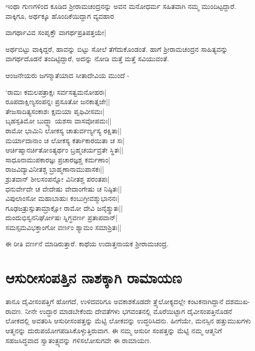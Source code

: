 ಇಂಥಾ ಗುಣಗಳಿಂದ ಕೂಡಿದ ಶ್ರೀರಾಮಚಂದ್ರನನ್ನು ಅವನ ಮನೋಧರ್ಮ ಸಹಿತವಾಗಿ ನಮ್ಮ ಮುಂದಿಟ್ಟದ್ದಾರೆ. ವಾಕ್ಕಿಗೂ, ಅರ್ಥಕ್ಕೂ ಹೊಂದಿಕೆಯಿದ್ದಾಗ ವ್ಯವಹಾರ 

\begin{shloka}
ವಾಗರ್ಥಾವಿವ ಸಂಪೃಕ್ತೌ ವಾಗರ್ಥಪ್ರತಿಪತ್ತಯೇ|
\end{shloka}
ಅರ್ಥಬಿಟ್ಟು ವಾಕ್ಕಿದ್ದರೆ, ಹಾವನ್ನು ಬಿಟ್ಟು ಸೋಲೆ ತೆಗೆದುಕೊಂಡಂತೆ. ಹಾಗೆ ಶ್ರೀರಾಮಚಂದ್ರನ ಸಾಹಿತ್ಯವನ್ನು ವಾಗರ್ಥದೊಡನೆ ತಂದಿಟ್ಟಿದ್ದಾರೆ, ಅದನ್ನು ನೋಡಿ ಮತ್ತೆ ಮತ್ತೆ ಸವಿಯುವಂತೆ.

ಆಂಜನೇಯರು ಜಗನ್ಮಾತೆಯಾದ ಸೀತಾದೇವಿಯ ಮುಂದೆ -

\begin{shloka}
`ರಾಮಃ ಕಮಲಪತ್ರಾಕ್ಷಃ ಸರ್ವಸತ್ವಮನೋಹರಃ|\\
ರೂಪದಾಕ್ಷಿಣ್ಯಸಂಪನ್ನಃ ಪ್ರಸೂತೋ ಜನಕಾತ್ನಜೇ||\\
ತೇಜಸಾದಿತ್ಯಸಂಕಾಶಃ ಕ್ಷಮಯಾ ಪೃಥಿವೀಸಮಃ|\\
ಬೃಹಸ್ಪತಿಮೋ ಬುದ್ಧ್ಯಾ ಯಶಸಾ ವಾಸವೋಪಮಃ||\\
ರಾಮೋ ಭಾಮಿನಿ ಲೋಕಸ್ಯ ಚಾತುರ್ವರ್ಣ್ಯಸ್ಯ ರಕ್ಷಿತಾ||\\
ಮರ್ಯಾದಾನಾಂ ಚ ಲೋಕಸ್ಯ ಕರ್ತಾಕಾರಯಿತಾ ಚ ಸಃ|\\
ಆರ್ಚಿಷ್ಮಾನರ್ಚಿತೋಽತ್ಯರ್ಥಂ ಬ್ರಹ್ಮಚರ್ಯವ್ರತೇ ಸ್ಥಿತಃ||\\
ಸಾಧೂನಾಮುಪಕಾರಜ್ಞಃ ಪ್ರಚಾರಜ್ಞಶ್ಚ ಕರ್ಮಣಾಂ|\\
ರಾಜವಿದ್ಯಾವಿನೀತಶ್ಚ ಬ್ರಾಹ್ಮಣಾನಾಮುಪಾಸಕಃ||\\
ಶ್ರುತವಾನ್ ಶೀಲಸಂಪನ್ನೋ ವಿನೀತಶ್ಚ ಪರಂತಪಃ|\\
ಧನುರ್ವೇದೇ ಚ ವೇದೇಷು ವೇದಾಂಗೇಷು ಚ ನಿಷ್ಠಿತಃ||\\
ವಿಪುಲಾಂಸೋ ಮಹಾಬಾಹುಃ ಕಂಬುಗ್ರೀವಶ್ಮುಭಾನನಃ|\\
ಗೂಢಜತ್ರುಸ್ಸುತಾಮ್ರಾಕ್ಷೋ ರಾಮೋ ದೇವಿ ಜನೈಶ್ಶ್ರುತಃ||\\
ದುಂದುಭಿಸ್ವನನಿರ್ಘೋಷಃ ಸ್ನಿಗ್ಧವರ್ಣ ಪ್ರತಾಪವಾನ್|\\
ಸಮಸ್ಸಮವಿಭಕ್ತಾಂಗೋ ವರ್ಣಂ ಶ್ಯಾಮಂ ಸಮಾಶ್ರಿತಃ||
\end{shloka}
ಈ ರೀತಿ ವರ್ಣನೆ ಮಾಡಿರುತ್ತಾರೆ. ಕಾಥೆಯ ಉದಾತ್ತನಾಯಕ ಶ್ರೀರಾಮಚಂದ್ರ.

\section*{ಆಸುರೀಸಂಪತ್ತಿನ ನಾಶಕ್ಕಾಗಿ ರಾಮಾಯಣ}

ತಾನೂ ದೈವೀಸಂಪತ್ತಿಗೆ ಹೋಗದೆ, ಉಳಿದವರಿಗೂ ಅವಕಾಶಕೊಡದೇ ತ್ರ್ಯೆಲೋಕ್ಯದಲ್ಲೇ ಕಂಟಕನಾಗಿದ್ದಾನೆ ದಶಮುಖ-ರಾವಣ. ನೀನೇ ಉದ್ಧಾರ ಮಾಡಬೇಕೆಂದು ದೇವತೆಗಳು ಭಗವಂತನಲ್ಲಿ ಮೊರೆಯಿಟ್ಟಾಗ ದೈವೀಸಂಪತ್ತಿನೊಡನೆ ಲೋಕದಲ್ಲಿ ಅವತರಿಸಿ ಆಸುರೀಸಂಪತ್ತನ್ನು ಮೆಟ್ಟಿ ಲೋಕವನ್ನು ಉದ್ಧರಿಸಿದನು. ಹೀಗೆಯೇ, ಮನಸ್ಸಿನ ಹತ್ತುಮುಖಗಳು ಆತ್ಮನನ್ನು ದುರುಪಯೋಗಪಡಿಸಿಕೊಳ್ಳುತ್ತಿರುವಾಗ. ಈ ನಮ್ಮ ಆಸುರೀ ಸಂಪತ್ತನ್ನು ಮೆಟ್ಟಿ ನಮ್ಮ ಆತ್ಮನಿಗೆ ಸಹಜಸಿದ್ಧವಾದ ಸ್ವಾತಂತ್ರ್ಯವನ್ನು ಗಳಿಸಲೋಸುಗವೇ ಈ ರಾಮಾಯಣ.

